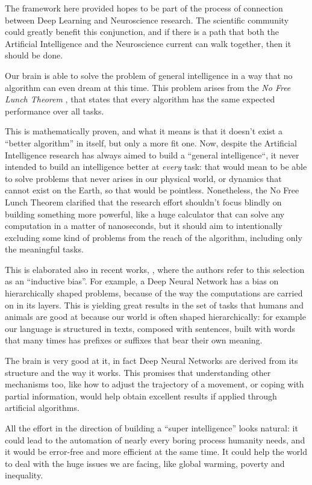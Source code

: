 The framework here provided hopes to be part of the process of connection between Deep Learning and Neuroscience research. The scientific community could greatly benefit this conjunction, and if there is a path that both the Artificial Intelligence and the Neuroscience current can walk together, then it should be done. 

Our brain is able to solve the problem of general intelligence in a way that no algorithm can even dream at this time. This problem arises from the \emph{No Free Lunch Theorem} \cite{wolpert1997no}, that states that every algorithm has the same expected performance over all tasks. 

This is mathematically proven, and what it means is that it doesn't exist a ``better algorithm'' in itself, but only a more fit one. Now, despite the Artificial Intelligence research has always aimed to build a ``general intelligence``, it never intended to build an intelligence better at \emph{every} task: that would mean to be able to solve problems that never arises in our physical world, or dynamics that cannot exist on the Earth, so that would be pointless. Nonetheless, the No Free Lunch Theorem clarified that the research effort shouldn't focus blindly on building something more powerful, like a huge calculator that can solve any computation in a matter of nanoseconds, but it should aim to intentionally excluding some kind of problems from the reach of the algorithm, including only the meaningful tasks.

This is elaborated also in recent works, \cite{richards2019deep}, where the authors refer to this selection as an ``inductive bias''. For example, a Deep Neural Network has a bias on hierarchically shaped problems, because of the way the computations are carried on in its layers. This is yielding great results in the set of tasks that humans and animals are good at because our world is often shaped hierarchically: for example our language is structured in texts, composed with sentences, built with words that many times has prefixes or suffixes that bear their own meaning.

The brain is very good at it, in fact Deep Neural Networks are derived from its structure and the way it works. This promises that understanding other mechanisms too, like how to adjust the trajectory of a movement, or coping with partial information, would help obtain excellent results if applied through artificial algorithms. 


All the effort in the direction of building a ``super intelligence'' looks natural: it could lead to the automation of nearly every boring process humanity needs, and it would be error-free and more efficient at the same time. It could help the world to deal with the huge issues we are facing, like global warming, poverty and inequality. 

